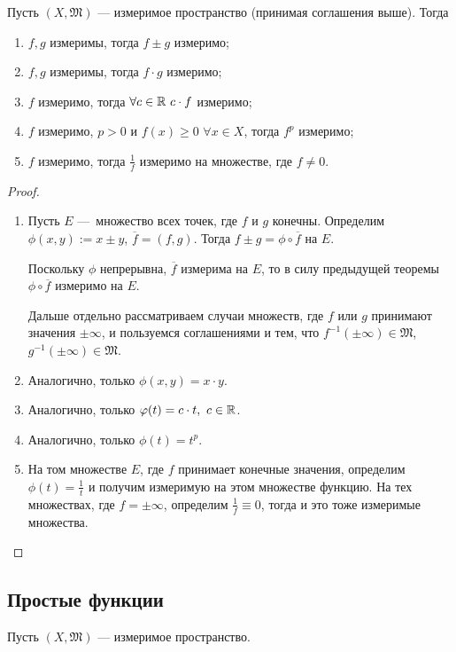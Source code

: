 \begin{theorem}
    Пусть $(X, \mathfrak{M})$ — измеримое пространство (принимая соглашения выше).
    Тогда
    \begin{enumerate}
        \item $f,g$ измеримы, тогда $f \pm g$ измеримо;
        \item $f,g$ измеримы, тогда $f \cdot g$ измеримо;
        \item $f$ измеримо, тогда $\forall c \in \mathbb{R} \ c \cdot f$ измеримо;
        \item $f$ измеримо, $p>0$ и $f(x) \geqslant 0$ $\forall x \in X$, тогда $f^p$ измеримо;
        \item $f$ измеримо, тогда $\frac{1}{f}$ измеримо на множестве, где $f \neq 0$.
    \end{enumerate}
\end{theorem} 
\begin{proof}
    \begin{enumerate}
        \item Пусть $E$ — множество всех точек, где $f$ и $g$ конечны.
        Определим $\phi(x,y) := x \pm y$, $\overline{f} = (f,g)$.
        Тогда $f \pm g = \phi \circ \overline{f}$ на $E$.
        
        Поскольку $\phi$ непрерывна, $\overline{f}$ измерима на $E$, то в силу предыдущей теоремы $\phi \circ \overline{f}$ измеримо на $E$.

        Дальше отдельно рассматриваем случаи множеств, где $f$ или $g$ принимают значения $\pm \infty$, и пользуемся соглашениями и тем, что $f^{-1}(\pm \infty) \in \mathfrak{M}$, $g^{-1}(\pm \infty) \in \mathfrak{M}$.

        \item Аналогично, только $\phi(x,y) = x \cdot y$.
        \item Аналогично, только $\varphi(t) = c \cdot t, \ c \in \mathbb{R}$.
        \item Аналогично, только $\phi(t) = t^p$.
        \item На том множестве $E$, где $f$ принимает конечные значения, определим $\phi(t) = \frac{1}{t}$ и получим измеримую на этом множестве функцию. На тех множествах, где $f = \pm \infty$, определим $\frac{1}{f} \equiv 0$, тогда и это тоже измеримые множества.
    \end{enumerate}
\end{proof} 

\subsection{Простые функции}
Пусть $(X, \mathfrak{M})$ — измеримое пространство.

